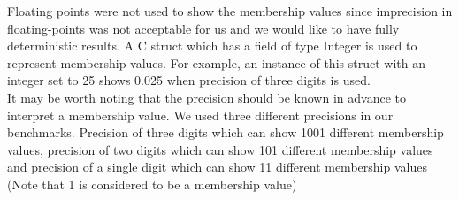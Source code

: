 \documentclass[4pt]{article}
\begin{document}
Floating points were not used to show the membership values since imprecision in floating-points was not acceptable for us and we would like to have fully deterministic results. A C struct which has a field of type Integer is used to represent membership values. For example, an instance of this struct with an integer set to 25 shows 0.025 when precision of three digits is used.\\
It may be worth noting that the precision should be known in advance to interpret a membership value. We used three different precisions in our benchmarks. Precision of three digits which can show 1001 different membership values, precision of two digits which can show 101 different membership values and precision of a single digit which can show 11 different membership values (Note that 1 is considered to be a membership value)
\begin{comment}
A C struct which is shown in Figure~\ref{membership_value_struct} is used instead.

\begin{figure} [ht]
\begin{verbatim}
typedef struct {
  unsigned char is_one;
  unsigned short value;
} membership_value;
\end{verbatim}
\caption{The C struct which is used to represent membership values.}
\label{membership_value_struct}
\end{figure}

Considering this data-type whenever \verb=is_one= is 1 we are sure that the membership value is 1 otherwise \verb=value= is the determinant factor. For example, to show membership value 0.255, \verb=is_one= is set to 0 and \verb=value= is set to  255.\\
It may be worth noting that the precision should be known in advance. We have used three different precisions in our benchmarks. Precision of three digits which can show 1001 different membership values, Precision of two digits which can show 101 different membership values and precision of a single digit which can show 11 different membership values (Note that 1 is considered to be membership value). As an example, consider the precision of three digits, in this case, a \verb=membership_value= with 1 as its \verb=value= and 0 as its \verb=is_one= is interpreted as 0.001. The same case is interpreted as 0.01 when precision of two digits is used.
\end{comment}
\end{document}
